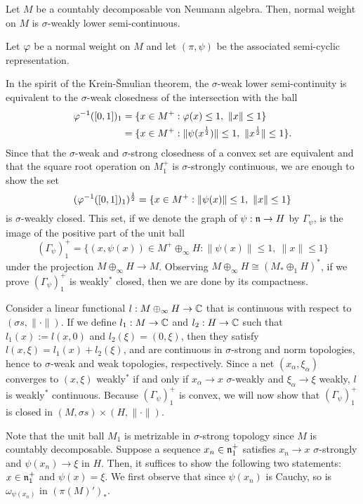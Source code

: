 \documentclass{../../../small}
\begin{document}
\begin{thm}
Let $M$ be a countably decomposable von Neumann algebra.
Then,  normal weight on $M$ is $\sigma$-weakly lower semi-continuous.
\end{thm}
\begin{pf}
Let $\varphi$ be a normal weight on $M$ and let $(\pi,\psi)$ be the associated semi-cyclic representation.

In the spirit of the Krein-\v Smulian theorem, the $\sigma$-weak lower semi-continuity is equivalent to the $\sigma$-weak closedness of the intersection with the ball
\begin{align*}
\varphi^{-1}([0,1])_1
&=\{x\in M^+:\varphi(x)\le1,\ \|x\|\le1\}\\
&=\{x\in M^+:\|\psi(x^{\frac12})\|\le1,\ \|x^{\frac12}\|\le1\}.
\end{align*}
Since that the $\sigma$-weak and $\sigma$-strong closedness of a convex set are equivalent and that the square root operation on $M^+_1$ is $\sigma$-strongly continuous, we are enough to show the set
\[(\varphi^{-1}([0,1])_1)^{\frac12}=\{x\in M^+:\|\psi(x)\|\le1,\ \|x\|\le1\}\]
is $\sigma$-weakly closed.
This set, if we denote the graph of $\psi:\mathfrak{n}\to H$ by $\Gamma_\psi$, is the image of the positive part of the unit ball
\[(\Gamma_\psi)^+_1=\{(x,\psi(x))\in M^+\oplus_\infty H:\|\psi(x)\|\le1,\ \|x\|\le1\}\]
under the projection $M\oplus_\infty H\to M$.
Observing $M\oplus_\infty H\cong(M_*\oplus_1H)^*$, if we prove $(\Gamma_\psi)_1^+$ is weakly$^*$ closed, then we are done by its compactness.

Consider a linear functional $l:M\oplus_\infty H\to\mathbb{C}$ that is continuous with respect to $(\sigma s,\|\cdot\|)$.
If we define $l_1:M\to\mathbb{C}$ and $l_2:H\to\mathbb{C}$ such that $l_1(x):=l(x,0)$ and $l_2(\xi)=(0,\xi)$, then they satisfy $l(x,\xi)=l_1(x)+l_2(\xi)$, and are continuous in $\sigma$-strong and norm topologies, hence to $\sigma$-weak and weak topologies, respectively.
Since a net $(x_\alpha,\xi_\alpha)$ converges to $(x,\xi)$ weakly$^*$ if and only if $x_\alpha\to x$ $\sigma$-weakly and $\xi_\alpha\to\xi$ weakly, $l$ is weakly$^*$ continuous.
Because $(\Gamma_\psi)_1^+$ is convex, we will now show that $(\Gamma_\psi)^+_1$ is closed in $(M,\sigma s)\times(H,\|\cdot\|)$.

Note that the unit ball $M_1$ is metrizable in $\sigma$-strong topology since $M$ is countably decomposable.
Suppose a sequence $x_n\in\mathfrak{n}^+_1$ satisfies $x_n\to x$ $\sigma$-strongly and $\psi(x_n)\to\xi$ in $H$.
Then, it suffices to show the following two statements: $x\in\mathfrak{n}^+_1$ and $\psi(x)=\xi$.
We first observe that since $\psi(x_n)$ is Cauchy, so is $\omega_{\psi(x_n)}$ in $(\pi(M)')_*$.


\end{pf}
\end{document}
